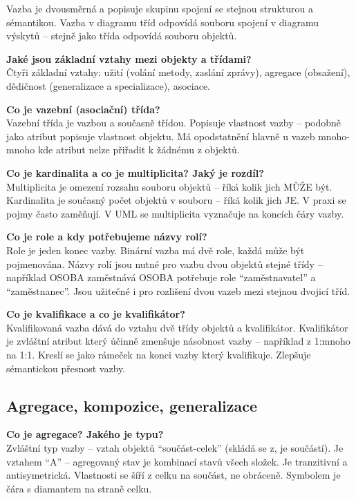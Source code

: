 \documentclass[12pt, a4paper]{article}
\begin{document}
Vazba je dvousměrná a popisuje skupinu spojení se stejnou strukturou a sémantikou. Vazba v diagramu tříd odpovídá souboru spojení v diagramu výskytů -- stejně jako třída odpovídá souboru objektů.

\textbf{Jaké jsou základní vztahy mezi objekty a třídami?}\\
Čtyři základní vztahy: užití (volání metody, zaslání zprávy), agregace (obsažení), dědičnost (generalizace a specializace), asociace.

\textbf{Co je vazební (asociační) třída?}\\
Vazební třída je vazbou a současně třídou. Popisuje vlastnost vazby -- podobně jako atribut popisuje vlastnost objektu. Má opodstatnění hlavně u vazeb mnoho-mnoho kde atribut nelze přiřadit k žádnému z objektů.

\textbf{Co je kardinalita a co je multiplicita? Jaký je rozdíl?}\\
Multiplicita je omezení rozsahu souboru objektů -- říká kolik jich MŮŽE být. Kardinalita je současný počet objektů v souboru -- říká kolik jich JE. V praxi se pojmy často zaměňují. V UML se multiplicita vyznačuje na koncích čáry vazby.

\textbf{Co je role a kdy potřebujeme názvy rolí?}\\
Role je jeden konec vazby. Binární vazba má dvě role, každá může být pojmenována. Názvy rolí jsou nutné pro vazbu dvou objektů stejné třídy -- například OSOBA zaměstnává OSOBA potřebuje role ``zaměstnavatel'' a ``zaměstnanec''. Jsou užitečné i pro rozlišení dvou vazeb mezi stejnou dvojicí tříd.

\textbf{Co je kvalifikace a co je kvalifikátor?}\\
Kvalifikovaná vazba dává do vztahu dvě třídy objektů a kvalifikátor. Kvalifikátor je zvláštní atribut který účinně zmenšuje násobnost vazby -- například z 1:mnoho na 1:1. Kreslí se jako rámeček na konci vazby který kvalifikuje. Zlepšuje sémantickou přesnost vazby.

\subsection{Agregace, kompozice, generalizace}

\textbf{Co je agregace? Jakého je typu?}\\
Zvláštní typ vazby -- vztah objektů ``součást-celek'' (skládá se z, je součástí). Je vztahem ``A'' -- agregovaný stav je kombinací stavů všech složek. Je tranzitivní a antisymetrická. Vlastnosti se šíří z celku na součást, ne obráceně. Symbolem je čára s diamantem na straně celku.
\end{document}
